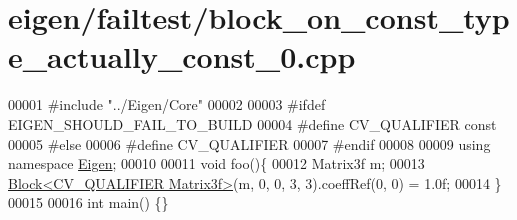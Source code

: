 \hypertarget{eigen_2failtest_2block__on__const__type__actually__const__0_8cpp_source}{}\section{eigen/failtest/block\+\_\+on\+\_\+const\+\_\+type\+\_\+actually\+\_\+const\+\_\+0.cpp}
\label{eigen_2failtest_2block__on__const__type__actually__const__0_8cpp_source}

\begin{DoxyCode}
00001 \textcolor{preprocessor}{#include "../Eigen/Core"}
00002 
00003 \textcolor{preprocessor}{#ifdef EIGEN\_SHOULD\_FAIL\_TO\_BUILD}
00004 \textcolor{preprocessor}{#define CV\_QUALIFIER const}
00005 \textcolor{preprocessor}{#else}
00006 \textcolor{preprocessor}{#define CV\_QUALIFIER}
00007 \textcolor{preprocessor}{#endif}
00008 
00009 \textcolor{keyword}{using namespace }\hyperlink{namespace_eigen}{Eigen};
00010 
00011 \textcolor{keywordtype}{void} foo()\{
00012     Matrix3f m;
00013     \hyperlink{group___core___module_class_eigen_1_1_block}{Block<CV\_QUALIFIER Matrix3f>}(m, 0, 0, 3, 3).coeffRef(0, 0) = 1.0f;
00014 \}
00015 
00016 \textcolor{keywordtype}{int} main() \{\}
\end{DoxyCode}
